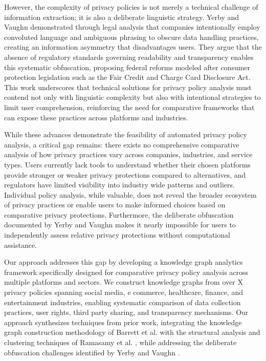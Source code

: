 \documentclass[conference]{IEEEtran}
\begin{document}
However, the complexity of privacy policies is not merely a technical challenge of information extraction; it is also a deliberate linguistic strategy. Yerby and Vaughn \cite{yerby2022} demonstrated through legal analysis that companies intentionally employ convoluted language and ambiguous phrasing to obscure data handling practices, creating an information asymmetry that disadvantages users. They argue that the absence of regulatory standards governing readability and transparency enables this systematic obfuscation, proposing federal reforms modeled after consumer protection legislation such as the Fair Credit and Charge Card Disclosure Act. This work underscores that technical solutions for privacy policy analysis must contend not only with linguistic complexity but also with intentional strategies to limit user comprehension, reinforcing the need for comparative frameworks that can expose these practices across platforms and industries.


While these advances demonstrate the feasibility of automated privacy policy analysis, a critical gap remains: there exists no comprehensive comparative analysis of how privacy practices vary across companies, industries, and service types. Users currently lack tools to understand whether their chosen platforms provide stronger or weaker privacy protections compared to alternatives, and regulators have limited visibility into industry wide patterns and outliers. Individual policy analysis, while valuable, does not reveal the broader ecosystem of privacy practices or enable users to make informed choices based on comparative privacy protections. Furthermore, the deliberate obfuscation documented by Yerby and Vaughn \cite{yerby2022} makes it nearly impossible for users to independently assess relative privacy protections without computational assistance.


Our approach addresses this gap by developing a knowledge graph analytics framework specifically designed for comparative privacy policy analysis across multiple platforms and sectors. We construct knowledge graphs from over X privacy policies spanning social media, e commerce, healthcare, finance, and entertainment industries, enabling systematic comparison of data collection practices, user rights, third party sharing, and transparency mechanisms. Our approach synthesizes techniques from prior work, integrating the knowledge graph construction methodology of Barrett et al. \cite{barrett2025} with the structural analysis and clustering techniques of Ramasamy et al. \cite{ramasamy2025}, while addressing the deliberate obfuscation challenges identified by Yerby and Vaughn \cite{yerby2022}.
\end{document}
